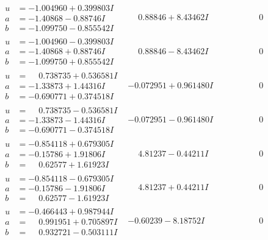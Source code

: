 \documentclass[1p]{elsarticle_modified}
\theoremstyle{definition}
\begin{document}
$$\begin{array}{c|c|c}
\begin{aligned}
u &= -1.004960 + 0.399803 I \\
a &= -1.40868 - 0.88746 I \\
b &= -1.099750 - 0.855542 I\end{aligned}
 & \phantom{-}0.88846 + 8.43462 I & \phantom{-0.000000 } 0 \\ \hline\begin{aligned}
u &= -1.004960 - 0.399803 I \\
a &= -1.40868 + 0.88746 I \\
b &= -1.099750 + 0.855542 I\end{aligned}
 & \phantom{-}0.88846 - 8.43462 I & \phantom{-0.000000 } 0 \\ \hline\begin{aligned}
u &= \phantom{-}0.738735 + 0.536581 I \\
a &= -1.33873 + 1.44316 I \\
b &= -0.690771 + 0.374518 I\end{aligned}
 & -0.072951 + 0.961480 I & \phantom{-0.000000 } 0 \\ \hline\begin{aligned}
u &= \phantom{-}0.738735 - 0.536581 I \\
a &= -1.33873 - 1.44316 I \\
b &= -0.690771 - 0.374518 I\end{aligned}
 & -0.072951 - 0.961480 I & \phantom{-0.000000 } 0 \\ \hline\begin{aligned}
u &= -0.854118 + 0.679305 I \\
a &= -0.15786 + 1.91806 I \\
b &= \phantom{-}0.62577 + 1.61923 I\end{aligned}
 & \phantom{-}4.81237 - 0.44211 I & \phantom{-0.000000 } 0 \\ \hline\begin{aligned}
u &= -0.854118 - 0.679305 I \\
a &= -0.15786 - 1.91806 I \\
b &= \phantom{-}0.62577 - 1.61923 I\end{aligned}
 & \phantom{-}4.81237 + 0.44211 I & \phantom{-0.000000 } 0 \\ \hline\begin{aligned}
u &= -0.466443 + 0.987944 I \\
a &= \phantom{-}0.991951 + 0.705897 I \\
b &= \phantom{-}0.932721 - 0.503111 I\end{aligned}
 & -0.60239 - 8.18752 I & \phantom{-0.000000 } 0 \\ \hline\begin{aligned}

\end{aligned}
\end{array}$$
\end{document}

